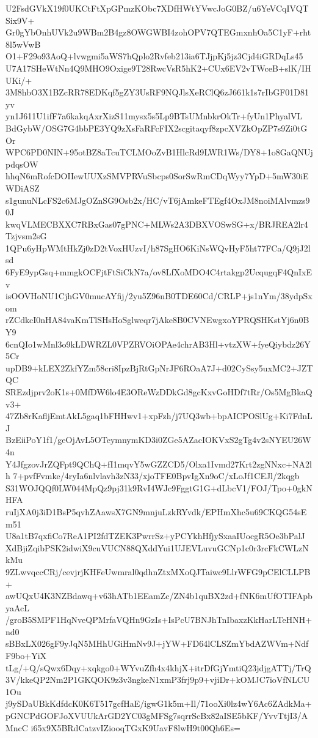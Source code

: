 U2FsdGVkX19f0UKCtFtXpGPmzKObc7XDfHWtYVwcJoG0BZ/u6YeVCqIVQTSix9V+
Gr0gYbOnhUVk2u9WBm2B4gz8OWGWBI4zohOPV7QTEGmxnhOa5C1yF+rht8l5wVwB
O1+F29o93AoQ+lvwgmi5aWS7hQplo2Rvfeb213ia6TJjpKj5jz3Cjd4iGRDqLs45
U7A17SHeWtNn4Q9MHO9Oxige9T28RwcVsR5hK2+CUx6EV2vTWceB+slK/IHUKi/+
3M8hbO3X1BZcRR78EDKqf5gZY3UsRF9NQJlsXeRClQ6zJ661k1s7rIbGF01D81yv
yn1J611U1ifF7a6kakqAxrXizS11mysx5s5Lp9BTsUMnbkrOkTr+fyUn1PhyalVL
BdGybW/OSG7G4bbPE3YQ9zXsFaRFcFIX2scgitaqyf8zpcXVZkOpZP7s9Zi0tGOr
WPC6PD0NIN+95otBZ8aTcuTCLMOoZvB1HlcRd9LWR1Ws/DY8+1o8GaQNUjpdqsOW
hhqN6mRofcDOIIewUUXzSMVPRVuSbcps0SorSwRmCDqWyy7YpD+5mW30iEWDiASZ
s1gunuNLcFS2c6MJgOZnSG9Osb2x/HC/vT6jAmkeFTEgf4OxJM8noiMAlvmzs90J
kwqVLMECBXXC7RBxGas07gPNC+MLWs2A3DBXVOSwSG+x/BRJREA2lr4Tzjvsm2sG
1QPu6yHpWMtHkZj0zD2tVoxHUzvI/h87SgHO6KiNsWQvHyF5ht77FCa/Q9jJ2lsd
6FyE9ypGsq+mmgkOCFjtFtSiCkN7a/ov8LfXoMDO4C4rtakgp2UcqugqF4QnIxEv
isOOVHoNU1CjhGV0mucAYfij/2yu5Z96nB0TDE60Cd/CRLP+js1nYm/38ydpSxom
rZCdkcI0nHA84vaKmTlSHsHoSglweqr7jAke8B0CVNEwgxoYPRQSHKstYj6n0BY9
6cnQIo1wMnl3o9kLDWRZL0VPZRVOiOPAe4chrAB3Hl+vtzXW+fyeQiybdz26Y5Cr
upDB9+kLEX2ZkfYZm58cri8IpzBjRtGpNrJF6ROaA7J+d02CySsy5uxMC2+JZTQC
SREzdjprv2oK1s+0MfDW6lo4E3OReWzDDkGd8gcKxvGoHDf7tRr/Os5MgBkaQv3+
47Zb8rKafljEmtAkL5gaq1bFHHwv1+xpFzh/j7UQ3wb+bpAICPOSlUg+Ki7FdnLJ
BzEiiPoY1f1/geOjAvL5OTeymnymKD3i0ZGe5AZacIOKVxS2gTg4v2sNYEU26W4n
Y4JfgzovJrZQFpt9QChQ+fI1mqvY5wGZZCD5/Olxa1Ivmd27Krt2zgNNxc+NA2lh
7+pvfFvmke/4ryIa6nlvlavh3zN33/xjoTFE0BpvIgXn9oC/xLoJf1CEJl/2kqgb
S31WOJQQf0LW044MpQz9pj31k9RvI4WJc9FggtG1G+dLbcV1/FOJ/Tpo+0gkNHFA
ruIjXA0j3iD1BsP5qvhZAawsX7GN9mnjuLzkRYvdk/EPHmXhc5u69CKQG54sEm51
U8a1tB7qxfiCo7ReA1PI2fdTZEK3PwrrSz+yPCYkhHfjySxaaIUocgR5Oe3bPalJ
XdBjiZqibPSK2idwiX9cuVUCN88QXddYui1UJEVLuvuGCNp1c0r3rcFkCWLzNkMu
9ZLwvqccCRj/cevjrjKHFeUwmral0qdhnZtxMXoQJTaiwc9LlrWFG9pCElCLLPB+
awUQxU4K3NZBdawq+v63hATb1EEamZc/ZN4b1quBX2zd+fNK6mUfOTIFApbyaAcL
/groB5SMPF1HqNveQPMrfaVQHn9GzIs+IsPcU7BNJhTnIbaxzKkHarLTeHNH+nd0
sBBxLX026gF9yJqN5MHhUGiHmNv9J+jYW+FD64lCLSZmYbdAZWVm+NdfF9bo+YiX
tLg/+Q/sQwx6Dqy+xqkgo0+WYvuZfh4x4khjX+itrDfGjYmtiQ23jdjgATTj/TrQ
3V/kkeQP2Nm2P1GKQOK9z3v3ngkeN1xmP3frj9p9+vjiDr+kOMJC7ioVfNLCU1Ou
j9ySDaUBkKdfdcK0K6T517gcfHaE/igwG1k5m+Il/71ooXi0lz4wY6Ac6ZAdkMa+
pGNCPdGOFJoXVUUkArGD2YC03gMFSg7sqrrScBx82aISE5bKF/YvvTtjI3/AMncC
i65x9X5BRdCatzvIZiooqTGxK9UavF8lwH9t00Qh6Es=
